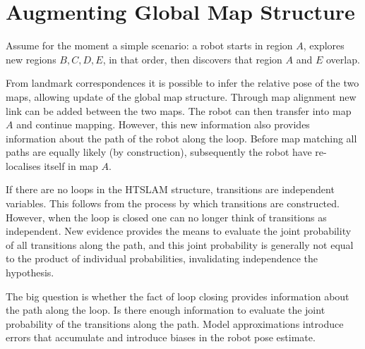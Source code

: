

\section{Augmenting Global Map Structure}
\label{sec:global_map_update}

Assume for the moment a simple scenario: a robot starts in
region $A$, explores new regions $B,C,D,E$, in that order, then
discovers that region $A$ and $E$ overlap.

From landmark correspondences it is possible to infer the relative
pose of the two maps, allowing update of the global map
structure. Through map alignment new link can be added between the two
maps. The robot can then transfer into map $A$ and continue
mapping. However, this new information also provides information about
the path of the robot along the loop. Before map matching all paths
are equally likely (by construction), subsequently the robot have
re-localises itself in map $A$.

If there are no loops in the HTSLAM structure, transitions are
independent variables. This follows from the process by which
transitions are constructed.  However, when the loop is closed one can
no longer think of transitions as independent. New evidence provides
the means to evaluate the joint probability of all transitions along
the path, and this joint probability is generally not equal to the
product of individual probabilities, invalidating independence the
hypothesis.

The big question is whether the fact of loop closing provides
information about the path along the loop. Is there enough information
to evaluate the joint probability of the transitions along the
path. Model approximations introduce errors that accumulate and
introduce biases in the robot pose estimate.

